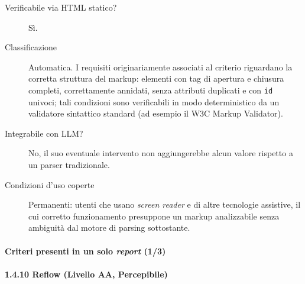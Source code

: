 \begin{description}
\item[Verificabile via HTML statico?] Sì.

\item[Classificazione] Automatica. I requisiti originariamente associati al criterio riguardano la corretta struttura del markup: elementi con tag di apertura e chiusura completi, correttamente annidati, senza attributi duplicati e con \texttt{id} univoci; tali condizioni sono verificabili in modo deterministico da un validatore sintattico standard (ad esempio il W3C Markup Validator).

\item[Integrabile con LLM?] No, il suo eventuale intervento non aggiungerebbe alcun valore rispetto a un parser tradizionale.

\item[Condizioni d'uso coperte] Permanenti: utenti che usano \emph{screen reader} e di altre tecnologie assistive, il cui corretto funzionamento presuppone un markup analizzabile senza ambiguità dal motore di parsing sottostante.

\end{description}

\paragraph{Criteri presenti in un solo \emph{report} (1/3)}

\paragraph*{1.4.10 Reflow (Livello AA, Percepibile)}

